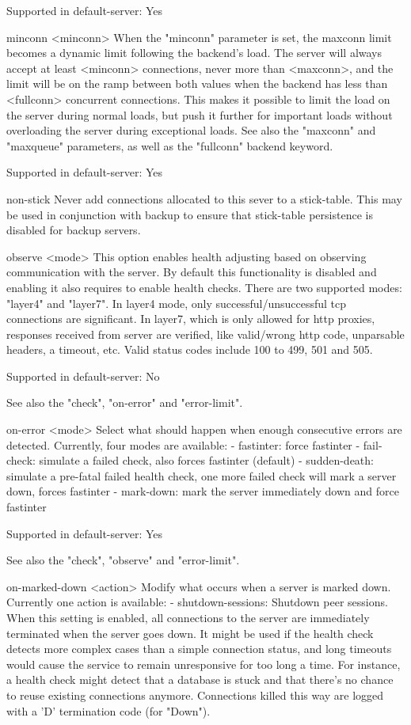   Supported in default-server: Yes

minconn <minconn>
  When the "minconn" parameter is set, the maxconn limit becomes a dynamic
  limit following the backend's load. The server will always accept at least
  <minconn> connections, never more than <maxconn>, and the limit will be on
  the ramp between both values when the backend has less than <fullconn>
  concurrent connections. This makes it possible to limit the load on the
  server during normal loads, but push it further for important loads without
  overloading the server during exceptional loads. See also the "maxconn"
  and "maxqueue" parameters, as well as the "fullconn" backend keyword.

  Supported in default-server: Yes

non-stick
  Never add connections allocated to this sever to a stick-table.
  This may be used in conjunction with backup to ensure that
  stick-table persistence is disabled for backup servers.

observe <mode>
  This option enables health adjusting based on observing communication with
  the server. By default this functionality is disabled and enabling it also
  requires to enable health checks. There are two supported modes: "layer4" and
  "layer7". In layer4 mode, only successful/unsuccessful tcp connections are
  significant. In layer7, which is only allowed for http proxies, responses
  received from server are verified, like valid/wrong http code, unparsable
  headers, a timeout, etc. Valid status codes include 100 to 499, 501 and 505.

  Supported in default-server: No

  See also the "check", "on-error" and "error-limit".

on-error <mode>
  Select what should happen when enough consecutive errors are detected.
  Currently, four modes are available:
  - fastinter: force fastinter
  - fail-check: simulate a failed check, also forces fastinter (default)
  - sudden-death: simulate a pre-fatal failed health check, one more failed
    check will mark a server down, forces fastinter
  - mark-down: mark the server immediately down and force fastinter

  Supported in default-server: Yes

  See also the "check", "observe" and "error-limit".

on-marked-down <action>
  Modify what occurs when a server is marked down.
  Currently one action is available:
  - shutdown-sessions: Shutdown peer sessions. When this setting is enabled,
    all connections to the server are immediately terminated when the server
    goes down. It might be used if the health check detects more complex cases
    than a simple connection status, and long timeouts would cause the service
    to remain unresponsive for too long a time. For instance, a health check
    might detect that a database is stuck and that there's no chance to reuse
    existing connections anymore. Connections killed this way are logged with
    a 'D' termination code (for "Down").

